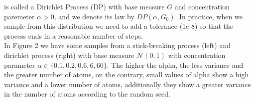 \documentclass{article}
\begin{document}
is called a Dirichlet Process (DP) with base measure $G$ and concentration paremeter $\alpha>0$, and we denote its law by $DP(\alpha, G_{0})$. In practice, when we sample from this distribution we need to add a tolerance (1e-8) so that the process ends in a reasonable number of steps.\\

In Figure 2 we have some samples from a stick-breaking process (left) and dirichlet process  (right) with base measure $\mathcal{N}(0, 1)$ with concentration parameter $\alpha\in\{0.1, 0.2, 0.6, 6, 60\}$. The higher the alpha, the less variance and the greater number of atoms, on the contrary, small values of alpha show a high variance and a lower number of atoms, additionally they show a greater variance in the number of atoms according to the random seed.\\
\end{document}
